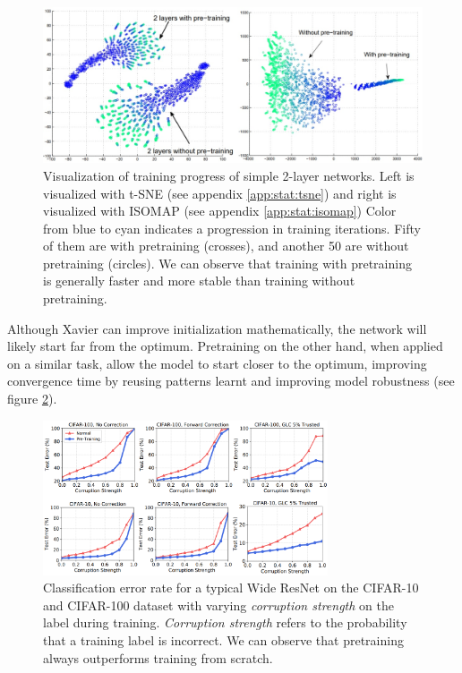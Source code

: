 \begin{figure}
    \centering
    \includegraphics[width=1\textwidth]{images/introduction/pretrain_vis.jpg}
    \caption[Visualization of training progress of simple 2-layer networks.]{Visualization of training progress of simple 2-layer networks. Left is visualized with t-SNE (see appendix \ref{app:stat:tsne}) and right is visualized with ISOMAP (see appendix \ref{app:stat:isomap}) Color from blue to cyan indicates a progression in training iterations. Fifty of them are with pretraining (crosses), and another 50 are without pretraining (circles). We can observe that training with pretraining is generally faster and more stable than training without pretraining.\cite{erhanWhyDoesUnsupervised}} 
    \label{fig:pretrain_tsne}
\end{figure}

Although Xavier can improve initialization mathematically, the network will likely start far from the optimum. Pretraining on the other hand, when applied on a similar task, allow the model to start closer to the optimum, improving convergence time by reusing patterns learnt and improving model robustness\cite{hendrycksUsingPreTrainingCan2019} (see figure \ref{fig:pretrain_robustness}).


\begin{figure}
    \centering
    \includegraphics[width=0.75\textwidth]{images/introduction/pretrain_robustness.png}
    \caption[Classification error rate for a typical Wide ResNet\cite{zagoruykoWideResidualNetworks2017} on the CIFAR-10 and CIFAR-100 dataset with varying \textit{corruption strength} on the label during training.]{Classification error rate for a typical Wide ResNet\cite{zagoruykoWideResidualNetworks2017} on the CIFAR-10 and CIFAR-100 dataset with varying \textit{corruption strength} on the label during training. \textit{Corruption strength} refers to the probability that a training label is incorrect. We can observe that pretraining always outperforms training from scratch.} 
    \label{fig:pretrain_robustness}
\end{figure}

